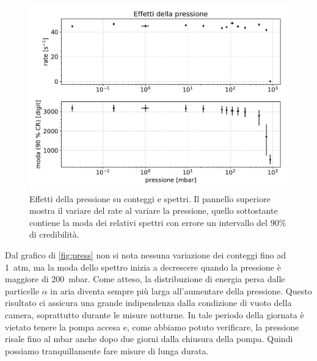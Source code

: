 \begin{figure}[h]
\centering
\includegraphics[width=30 em]{immagini/press}
\caption{Effetti della pressione su conteggi e spettri. Il pannello superiore mostra il variare del rate al variare la pressione, quello sottostante contiene la moda dei relativi spettri con errore un intervallo del 90\% di credibilità.}
\label{fig:press}
\end{figure}


Dal grafico di \autoref{fig:press} non si nota nessuna variazione dei conteggi fino ad \SI{1}{atm}, ma la moda dello spettro inizia a decrescere quando la pressione è maggiore di \SI{200}{mbar}. 
Come atteso, la distribuzione di energia persa dalle particelle $\alpha$ in aria diventa sempre più larga all'aumentare della pressione.
Questo risultato ci assicura una grande indipendenza dalla condizione di vuoto della camera, soprattutto durante le misure notturne. In tale periodo della giornata è vietato tenere la pompa accesa e, come abbiamo potuto verificare, la pressione risale fino al mbar anche dopo due giorni dalla chiusura della pompa. Quindi possiamo tranquillamente fare misure di lunga durata.


